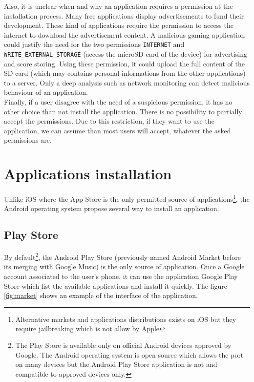 Also, it is unclear when and why an application requires a permission at the installation process.
Many free applications display advertisements to fund their development.
These kind of applications require the permission to access the internet to download the advertisement content.
A malicious gaming application could justify the need for the two permissions \texttt{INTERNET} and \texttt{WRITE\_EXTERNAL\_STORAGE} (access the microSD card of the device) for advertising and score storing. Using these permission, it could upload the full content of the SD card (which may contains personal informations from the other applications) to a server.
Only a deep analysis such as network monitoring can detect malicious behaviour of an application.\\

Finally, if a user disagree with the need of a suspicious permission, it has no other choice than not install the application.
There is no possibility to partially accept the permissions.
Due to this restriction, if they want to use the application, we can assume than most users will accept, whatever the asked permissions are.

\section{Applications installation}

Unlike iOS where the App Store is the only permitted source of applications\footnote{Alternative markets and applications distributions exists on iOS but they require jailbreaking which is not allow by Apple}, the Android operating system propose several way to install an application.

\subsection{Play Store}
By default\footnote{The Play Store is available only on official Android devices approved by Google. The Android operating system is open source which allows the port on many devices but the Android Play Store application is not and compatible to approved devices only.}, the Android Play Store (previously named Android Market before its merging with Google Music) is the only source of application.
Once a Google account associated to the user's phone, it can use the application Google Play Store which list the available applications and install it quickly.
The figure \ref{fig:market} shows an example of the interface of the application.\\

